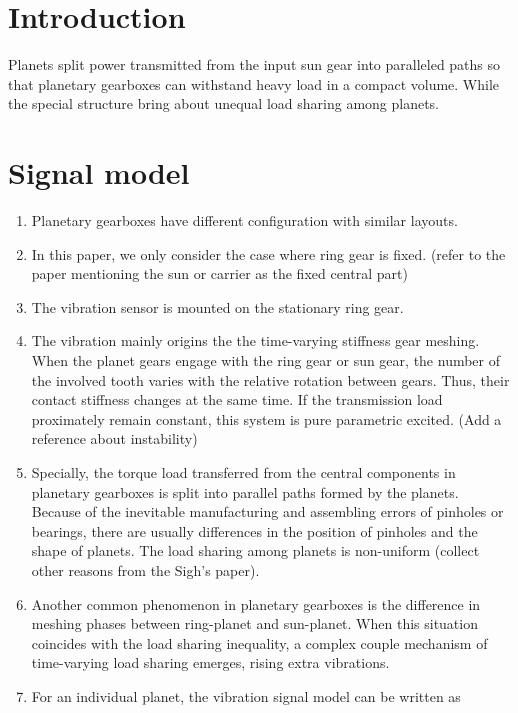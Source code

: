 \documentclass[a4paper,fleqn]{cas-sc}%
\begin{document}
\section{Introduction}
\par Planets split power transmitted from the input sun gear into paralleled paths so that planetary gearboxes can withstand heavy load in a compact volume. While the special structure bring about unequal load sharing among planets.
\section{Signal model}
\begin{enumerate}[1.]
    \item Planetary gearboxes have different configuration with similar layouts.
    \item In this paper, we only consider the case where ring gear is fixed. (refer to the paper mentioning the sun or carrier as the fixed central part)
    \item The vibration sensor is mounted on the stationary ring gear.
    \item The vibration mainly origins the the time-varying stiffness gear meshing. When the planet gears engage with the ring gear or sun gear, the number of the involved tooth varies with the relative rotation between gears. Thus, their contact stiffness changes at the same time. If the transmission load proximately remain constant, this system is pure parametric excited. (Add a reference about instability) 
    \item Specially, the torque load transferred from the central components in planetary gearboxes is split into parallel paths formed by the planets. Because of the inevitable manufacturing and assembling errors of pinholes or bearings, there are usually differences in the position of pinholes and the shape of planets. The load sharing among planets is non-uniform (collect other reasons from the Sigh's paper).
    \item Another common phenomenon in planetary gearboxes is the difference in meshing phases between ring-planet and sun-planet. When this situation coincides with the load sharing inequality, a complex couple mechanism of time-varying load sharing emerges, rising extra vibrations.
    \item For an individual planet, the vibration signal model can be written as
    \begin{equation}

\end{equation}
\end{enumerate}
\end{document}
